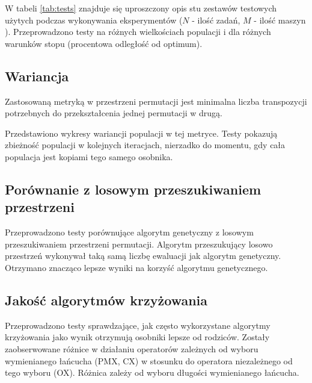 \documentclass[12pt]{article}
\begin{document}
W tabeli \ref{tab:tests} znajduje się uproszczony opis stu zestawów testowych użytych
podczas wykonywania eksperymentów ($N$ - ilość zadań, $M$ - ilość maszyn ). Przeprowadzono testy na różnych wielkościach populacji i dla różnych warunków stopu
(procentowa odległość od optimum).

\subsection{Wariancja}

Zastosowaną metryką w przestrzeni permutacji jest minimalna liczba
transpozycji potrzebnych do przekształcenia jednej permutacji w drugą.

Przedstawiono wykresy wariancji populacji w tej metryce. Testy
pokazują zbieżność populacji w kolejnych iteracjach, nierzadko do
momentu, gdy cała populacja jest kopiami tego samego osobnika.

\subsection{Porównanie z losowym przeszukiwaniem przestrzeni}

Przeprowadzono testy porównujące algorytm genetyczny z losowym
przeszukiwaniem przestrzeni permutacji. Algorytm przeszukujący losowo
przestrzeń wykonywał taką samą liczbę ewaluacji jak algorytm
genetyczny. Otrzymano znacząco lepsze wyniki na korzyść algorytmu genetycznego.

\subsection{Jakość algorytmów krzyżowania}

Przeprowadzono testy sprawdzające, jak często wykorzystane algorytmy
krzyżowania jako wynik otrzymują osobniki lepsze od rodziców. Zostały
zaobserwowane różnice w działaniu operatorów zależnych od wyboru
wymienianego łańcucha (PMX, CX) w stosunku do operatora niezależnego
od tego wyboru (OX). Różnica zależy od wyboru długości wymienianego łańcucha.
\end{document}
